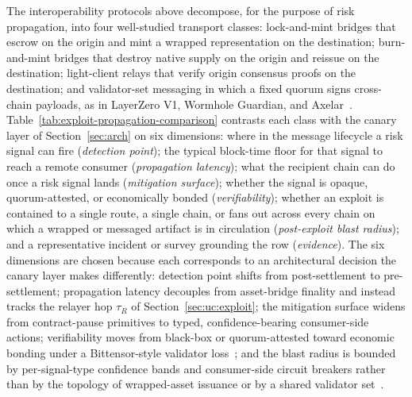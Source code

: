 \documentclass[journal]{IEEEtran}
\begin{document}
The interoperability protocols above decompose, for the purpose of
risk propagation, into four well-studied transport classes: lock-and-mint
bridges that escrow on the origin and mint a wrapped representation on
the destination; burn-and-mint bridges that destroy native supply on
the origin and reissue on the destination; light-client relays that
verify origin consensus proofs on the destination; and validator-set
messaging in which a fixed quorum signs cross-chain payloads, as in
LayerZero V1, Wormhole Guardian, and
Axelar~\cite{abs-2110-13871,zhang2023sok,augusto2024sok}.
Table~\ref{tab:exploit-propagation-comparison} contrasts each class
with the canary layer of Section~\ref{sec:arch} on six dimensions:
where in the message lifecycle a risk signal can fire
(\emph{detection point}); the typical block-time floor for that signal
to reach a remote consumer (\emph{propagation latency}); what the
recipient chain can do once a risk signal lands (\emph{mitigation
surface}); whether the signal is opaque, quorum-attested, or
economically bonded (\emph{verifiability}); whether an exploit is
contained to a single route, a single chain, or fans out across every
chain on which a wrapped or messaged artifact is in circulation
(\emph{post-exploit blast radius}); and a representative incident or
survey grounding the row (\emph{evidence}). The six dimensions are
chosen because each corresponds to an architectural decision the
canary layer makes differently: detection point shifts from
post-settlement to pre-settlement; propagation latency decouples from
asset-bridge finality and instead tracks the relayer hop $\tau_R$ of
Section~\ref{sec:uc:exploit}; the mitigation surface widens from
contract-pause primitives to typed, confidence-bearing consumer-side
actions; verifiability moves from black-box or quorum-attested toward
economic bonding under a Bittensor-style validator
loss~\cite{rao2021bittensor,opentensor2024yuma}; and the blast radius
is bounded by per-signal-type confidence bands and consumer-side
circuit breakers rather than by the topology of wrapped-asset issuance
or by a shared validator
set~\cite{augusto2024sok,zhang2023sok,wu2025safeguarding,werner2022sok,palaiokrassas2023multichain,daian2020flash}.
\end{document}
